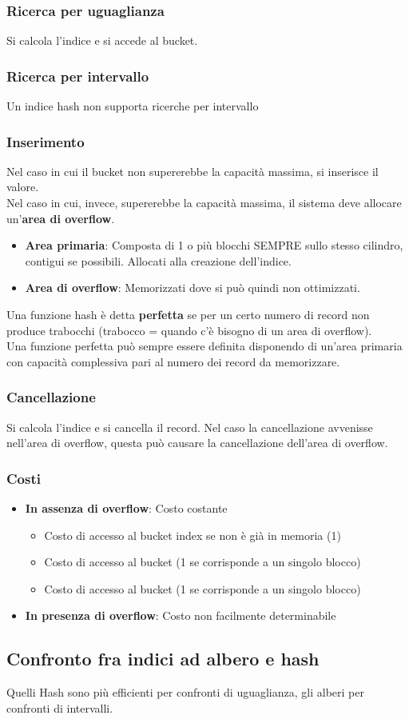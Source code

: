 \subsubsection{Ricerca per uguaglianza}
Si calcola l'indice e si accede al bucket.

\subsubsection{Ricerca per intervallo}
Un indice hash non supporta ricerche per intervallo

\subsubsection{Inserimento}
Nel caso in cui il bucket non supererebbe la capacità massima, si inserisce il valore.\\
Nel caso in cui, invece, supererebbe la capacità massima, il sistema deve allocare un'\textbf{area di overflow}.
\begin{itemize}
    \item \textbf{Area primaria}: Composta di 1 o più blocchi SEMPRE sullo stesso cilindro, contigui se possibili. Allocati alla creazione dell'indice.
    \item \textbf{Area di overflow}: Memorizzati dove si può quindi non ottimizzati.
\end{itemize}
Una funzione hash è detta \textbf{perfetta} se per un certo numero di record non produce trabocchi (trabocco = quando c'\`e bisogno di un area di overflow).\\
Una funzione perfetta può sempre essere definita disponendo di un’area primaria con capacità complessiva pari al numero dei record da memorizzare.

\subsubsection{Cancellazione}
Si calcola l'indice e si cancella il record. Nel caso la cancellazione avvenisse nell'area di overflow, questa può causare la cancellazione dell'area di overflow.

\subsubsection{Costi}
\begin{itemize}
    \item \textbf{In assenza di overflow}: Costo costante
    \begin{itemize}
        \item Costo di accesso al bucket index se non è già in memoria (1)
        \item Costo di accesso al bucket (1 se corrisponde a un singolo blocco)
        \item Costo di accesso al bucket (1 se corrisponde a un singolo blocco)
    \end{itemize}
    
    \item \textbf{In presenza di overflow}: Costo non facilmente determinabile
\end{itemize}

\subsection{Confronto fra indici ad albero e hash}
Quelli Hash sono più efficienti per confronti di uguaglianza, gli alberi per confronti di intervalli.